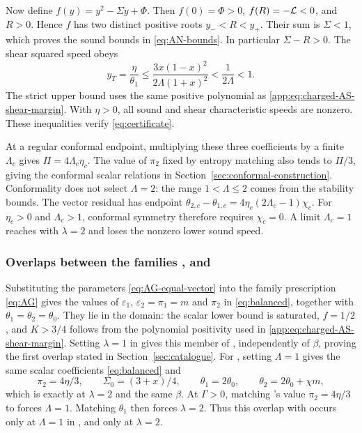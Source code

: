 Now define $f(y)=y^2-\Sigma y+\Phi$. Then $f(0)=\Phi>0$,
$f(R)=-\mathcal L<0$, and $R>0$. Hence $f$ has two distinct positive roots
$y_-<R<y_+$. Their sum is $\Sigma<1$, which proves the sound bounds in \eqref{eq:AN-bounds}.
In particular $\Sigma-R>0$. The shear squared speed obeys
\begin{equation}
 y_T=\frac{\eta}{\theta_1}
 \leq\frac{3x(1-x)^2}{2\Lambda(1+x)^2}
 <\frac1{2\Lambda}<1.
\end{equation}
The strict upper bound uses the same positive polynomial as
\eqref{app:eq:charged-AS-shear-margin}. With $\eta>0$, all sound and shear
characteristic speeds are nonzero. These inequalities verify
\eqref{eq:certificate}.

At a regular conformal endpoint, multiplying these three coefficients
by a finite $\Lambda_c$ gives $\Pi=4\Lambda_c\eta_c$. The value of
$\pi_2$ fixed by entropy matching also tends to $\Pi/3$, giving the
conformal scalar relations in Section~\ref{sec:conformal-construction}.
Conformality does not select $\Lambda=2$: the range $1<\Lambda\leq2$
comes from the stability bounds.
The vector residual has endpoint
$\theta_{2,c}-\theta_{1,c}=4\eta_c(2\Lambda_c-1)\chi_c$.
For $\eta_c>0$ and $\Lambda_c>1$, conformal symmetry therefore requires
$\chi_c=0$. A limit
$\Lambda_c=1$ reaches  with $\lambda=2$ and loses the nonzero lower
sound speed.



\subsubsection*{Overlaps between the families ,  and }
\label{app:sec:family-inclusions}
Substituting the parameters \eqref{eq:AG-equal-vector} into the family
 prescription \eqref{eq:AG} gives the values of
$\varepsilon_1$, $\varepsilon_2=\pi_1=m$ and $\pi_2$ in
\eqref{eq:balanced}, together with $\theta_1=\theta_2=\theta_0$.
They lie in the  domain: the scalar lower bound is saturated,
$f=1/2$, and $K>3/4$ follows from the polynomial positivity used in
\eqref{app:eq:charged-AS-shear-margin}. Setting $\lambda=1$ in  gives this member of ,
independently of $\beta$, proving the first overlap stated
in Section~\ref{sec:catalogue}.
For , setting $\Lambda=1$ gives the same scalar coefficients
\eqref{eq:balanced} and
\[
 \pi_2=4\eta/3,\qquad \Sigma_0=(3+x)/4,\qquad
 \theta_1=2\theta_0,\qquad \theta_2=2\theta_0+\chi m,
\]
which is exactly  at $\lambda=2$ and the same $\beta$.
At $\Gamma>0$, matching 's value $\pi_2=4\eta/3$ to  forces
$\Lambda=1$. Matching $\theta_1$ then forces $\lambda=2$.
Thus this overlap with  occurs only at $\Lambda=1$ in , and
only at $\lambda=2$.


